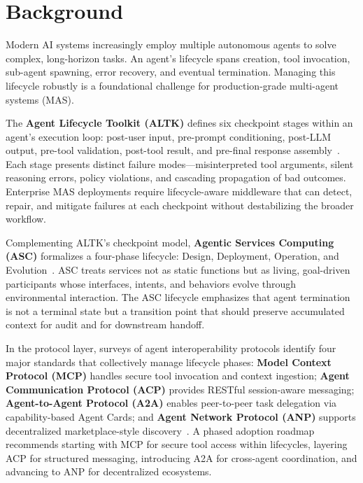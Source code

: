 \section{Background}


Modern AI systems increasingly employ multiple autonomous agents to solve complex, long-horizon tasks. An agent's lifecycle spans creation, tool invocation, sub-agent spawning, error recovery, and eventual termination. Managing this lifecycle robustly is a foundational challenge for production-grade multi-agent systems (MAS).

The \textbf{Agent Lifecycle Toolkit (ALTK)} defines six checkpoint stages within an agent's execution loop: post-user input, pre-prompt conditioning, post-LLM output, pre-tool validation, post-tool result, and pre-final response assembly~\cite{arxiv:2603.15473}. Each stage presents distinct failure modes---misinterpreted tool arguments, silent reasoning errors, policy violations, and cascading propagation of bad outcomes. Enterprise MAS deployments require lifecycle-aware middleware that can detect, repair, and mitigate failures at each checkpoint without destabilizing the broader workflow.

Complementing ALTK's checkpoint model, \textbf{Agentic Services Computing (ASC)} formalizes a four-phase lifecycle: Design, Deployment, Operation, and Evolution~\cite{arxiv:2509.24380v1}. ASC treats services not as static functions but as living, goal-driven participants whose interfaces, intents, and behaviors evolve through environmental interaction. The ASC lifecycle emphasizes that agent termination is not a terminal state but a transition point that should preserve accumulated context for audit and for downstream handoff.

In the protocol layer, surveys of agent interoperability protocols identify four major standards that collectively manage lifecycle phases: \textbf{Model Context Protocol (MCP)} handles secure tool invocation and context ingestion; \textbf{Agent Communication Protocol (ACP)} provides RESTful session-aware messaging; \textbf{Agent-to-Agent Protocol (A2A)} enables peer-to-peer task delegation via capability-based Agent Cards; and \textbf{Agent Network Protocol (ANP)} supports decentralized marketplace-style discovery~\cite{arxiv:2604.02369}. A phased adoption roadmap recommends starting with MCP for secure tool access within lifecycles, layering ACP for structured messaging, introducing A2A for cross-agent coordination, and advancing to ANP for decentralized ecosystems.

